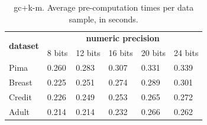 \begin{table}[htp]
\centering
\caption{\acs{gc}+\acs{k-m}. Average pre-computation times per data sample, in seconds.}
\label{table:avgKMAllDatasets}
\begin{tabular}{|l|l|l|l|l|l|}
\hline
\multirow{2}{*}{\textbf{dataset}} & \multicolumn{5}{c|}{\textbf{numeric precision}}                                             \\ \cline{2-6} 
                                  & 8 bits & 12 bits & 16 bits & 20 bits & 24 bits \\ \hline
Pima                              & 0.260           & 0.283            & 0.307            & 0.331            & 0.339            \\ \hline
Breast                            & 0.225           & 0.251            & 0.274            & 0.289            & 0.301            \\ \hline
Credit                            & 0.226           & 0.249            & 0.253            & 0.265            & 0.272            \\ \hline
Adult                             & 0.214           & 0.214            & 0.232            & 0.266            & 0.262            \\ \hline
\end{tabular}
\end{table}




